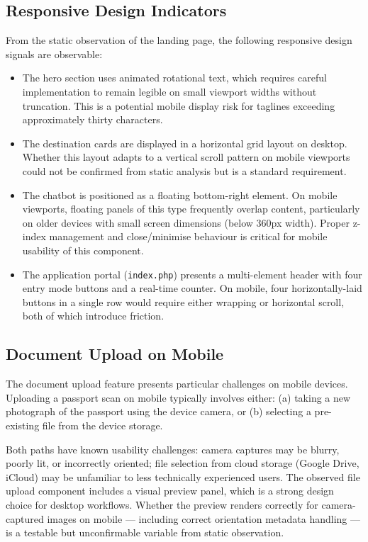 \documentclass[journal, 10pt, twoside]{IEEEtran}
\begin{document}
\subsection{Responsive Design Indicators}
From the static observation of the landing page, the following responsive
design signals are observable:

\begin{itemize}
  \item The hero section uses animated rotational text, which requires
  careful implementation to remain legible on small viewport widths without
  truncation. This is a potential mobile display risk for taglines exceeding
  approximately thirty characters.
  \item The destination cards are displayed in a horizontal grid layout on
  desktop. Whether this layout adapts to a vertical scroll pattern on mobile
  viewports could not be confirmed from static analysis but is a standard
  requirement.
  \item The chatbot is positioned as a floating bottom-right element. On
  mobile viewports, floating panels of this type frequently overlap content,
  particularly on older devices with small screen dimensions (below 360px
  width). Proper z-index management and close/minimise behaviour is critical
  for mobile usability of this component.
  \item The application portal (\texttt{index.php}) presents a multi-element
  header with four entry mode buttons and a real-time counter. On mobile,
  four horizontally-laid buttons in a single row would require either
  wrapping or horizontal scroll, both of which introduce friction.
\end{itemize}

\subsection{Document Upload on Mobile}
The document upload feature presents particular challenges on mobile devices.
Uploading a passport scan on mobile typically involves either:
(a) taking a new photograph of the passport using the device camera, or
(b) selecting a pre-existing file from the device storage.

Both paths have known usability challenges: camera captures may be
blurry, poorly lit, or incorrectly oriented; file selection from cloud
storage (Google Drive, iCloud) may be unfamiliar to less technically
experienced users. The observed file upload component includes a visual
preview panel, which is a strong design choice for desktop workflows.
Whether the preview renders correctly for camera-captured images on
mobile --- including correct orientation metadata handling --- is a
testable but unconfirmable variable from static observation.
\end{document}
